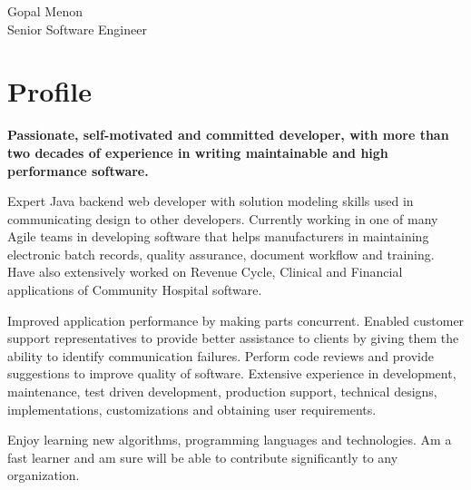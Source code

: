 \documentclass[10pt]{article} %
\begin{document}
\begin{paracol}{2} %


\parbox[top][0.12\textheight][c]{\linewidth}{ %
	\vspace{-0.04\textheight} %
	\centering %
	{\sffamily\Huge Gopal Menon}\\\medskip %
	{\Huge\color{headings} Senior Software Engineer}
}


\section{Profile}

{\raggedright\textbf{Passionate, self-motivated and committed developer, with more than two decades of experience in writing maintainable and high performance software.}\\\medskip}
Expert Java backend web developer with solution modeling skills used in communicating design to other developers. Currently
working in one of many Agile teams in developing software that helps manufacturers in maintaining electronic batch records, quality assurance, document workflow and training. Have also extensively worked on Revenue Cycle, Clinical and Financial applications of Community Hospital software.\medskip

Improved application performance by making parts concurrent. Enabled customer support representatives to provide better assistance to clients by giving them the ability to identify communication failures. Perform code reviews and provide suggestions to improve quality of software. Extensive experience in development, maintenance, test driven development, production support, technical designs, implementations, customizations and obtaining user requirements.\medskip

Enjoy learning new algorithms, programming languages and technologies. Am a fast learner and am sure will be able to contribute significantly to any organization. 



\end{paracol}
\end{document}
